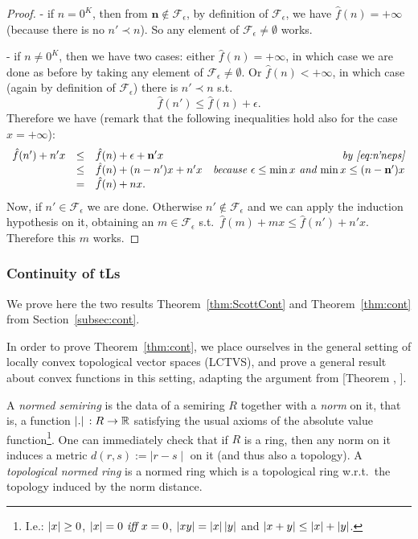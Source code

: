 \begin{proof}
- if $ n  =0^{K}$, then from $\mathbf  n\notin \mathcal F_{\epsilon}$, by definition of $\mathcal F_\epsilon$, we have $\hat f( n  )=+\infty$ (because there is no $ n  '\prec n  $).
So any element of $\mathcal F_\epsilon\neq\emptyset$ works.

- if $ n  \neq 0^{K}$, then we have two cases:
either $\hat f( n  )=+\infty$, in which case we are done as before by taking any element of $\mathcal F_\epsilon\neq\emptyset$.
Or $\hat f( n  )<+\infty$, in which case (again by definition of $\mathcal F_\epsilon$) there is $ n  '\prec n  $ s.t.\ \begin{equation}\label{eq:n'neps} \hat f( n  ')\leq \hat f( n  )+\epsilon.\end{equation}
Therefore we have (remark that the following inequalities hold also for the case $x=+\infty$):
\[\begin{array}{rclr}
 \hat f( n  ')+ n  ' x  & \leq & \hat f( n  ) + \epsilon +\mathbf  n' x  & \textit{by \eqref{eq:n'neps}} \\
 & \leq & \hat f( n  ) + ( n  - n  ') x  +  n  ' x  & \textit{because $\epsilon\leq\min x $ and $\min  x \leq( n  -\mathbf  n') x $} \\
 & = & \hat f( n  )+  n   x . &
\end{array}\]
Now, if $ n  '\in\mathcal F_\epsilon$ we are done.
Otherwise $ n  '\notin\mathcal F_\epsilon$ and we can apply the induction hypothesis on it, obtaining an $ m  \in\mathcal F_\epsilon$ s.t.\ $\hat f( m  )+ m   x  \leq \hat f( n  ')+ n  ' x $.
Therefore this $ m  $ works.
\end{proof}


\subsubsection{Continuity of tLs}

We prove here the two results Theorem~\ref{thm:ScottCont} and Theorem~\ref{thm:cont} from Section~\ref{subsec:cont}.

In order to prove Theorem~\ref{thm:cont}, we place ourselves in the general setting of locally convex topological vector spaces (LCTVS), and prove a general result about convex functions in this setting, adapting the argument from [Theorem , \cite{}].

\begin{definition}
 A \emph{normed semiring} is the data of a semiring $R$ together with a \emph{norm} on it, that is, a function $\left\lvert.\right\rvert\,:R\to\mathbb{R}$ satisfying the usual axioms of the absolute value function\footnote{I.e.: $\left\lvert x\right\rvert\geq 0$, $\left\lvert x\right\rvert =0 \textit{ iff } x=0$, $\left\lvert xy\right\rvert=\left\lvert x\right\rvert\left\lvert y\right\rvert$ and $\left\lvert x+y\right\rvert\leq \left\lvert x\right\rvert+\left\lvert y\right\rvert$.}.
 One can immediately check that if $R$ is a ring, then any norm on it induces a metric $d(r,s):=\mid r-s\mid$ on it (and thus also a topology).
 A \emph{topological normed ring} is a normed ring which is a topological ring w.r.t.\ the topology induced by the norm distance.
\end{definition}

